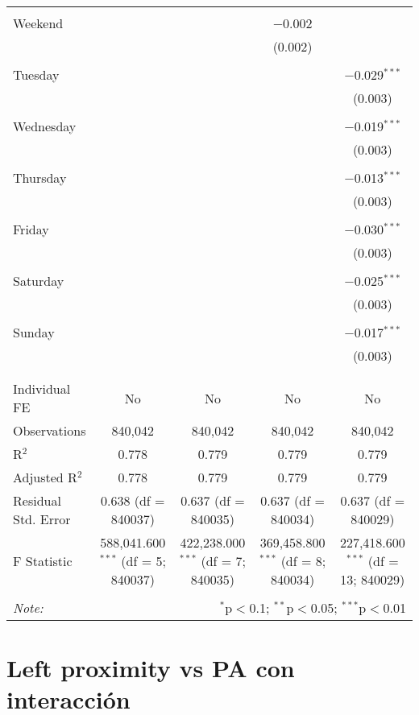 \documentclass[
]{article}
\begin{document}
\begin{table}[!htbp]
{\begin{tabular}{@{\extracolsep{5pt}}lcccc}
  & & & & \\ 
 Weekend &  &  & $-$0.002 &  \\ 
  &  &  & (0.002) &  \\ 
  & & & & \\ 
 Tuesday &  &  &  & $-$0.029$^{***}$ \\ 
  &  &  &  & (0.003) \\ 
  & & & & \\ 
 Wednesday &  &  &  & $-$0.019$^{***}$ \\ 
  &  &  &  & (0.003) \\ 
  & & & & \\ 
 Thursday &  &  &  & $-$0.013$^{***}$ \\ 
  &  &  &  & (0.003) \\ 
  & & & & \\ 
 Friday &  &  &  & $-$0.030$^{***}$ \\ 
  &  &  &  & (0.003) \\ 
  & & & & \\ 
 Saturday &  &  &  & $-$0.025$^{***}$ \\ 
  &  &  &  & (0.003) \\ 
  & & & & \\ 
 Sunday &  &  &  & $-$0.017$^{***}$ \\ 
  &  &  &  & (0.003) \\ 
  & & & & \\ 
\hline \\[-1.8ex] 
Individual FE & No & No & No & No \\ 
Observations & 840,042 & 840,042 & 840,042 & 840,042 \\ 
R$^{2}$ & 0.778 & 0.779 & 0.779 & 0.779 \\ 
Adjusted R$^{2}$ & 0.778 & 0.779 & 0.779 & 0.779 \\ 
Residual Std. Error & 0.638 (df = 840037) & 0.637 (df = 840035) & 0.637 (df = 840034) & 0.637 (df = 840029) \\ 
F Statistic & 588,041.600$^{***}$ (df = 5; 840037) & 422,238.000$^{***}$ (df = 7; 840035) & 369,458.800$^{***}$ (df = 8; 840034) & 227,418.600$^{***}$ (df = 13; 840029) \\ 
\hline 
\hline \\[-1.8ex] 
\textit{Note:}  & \multicolumn{4}{r}{$^{*}$p$<$0.1; $^{**}$p$<$0.05; $^{***}$p$<$0.01} \\ 
\end{tabular}
} 
\end{table} 
\newpage
\section{Left proximity vs PA con interacción}
\end{document}
